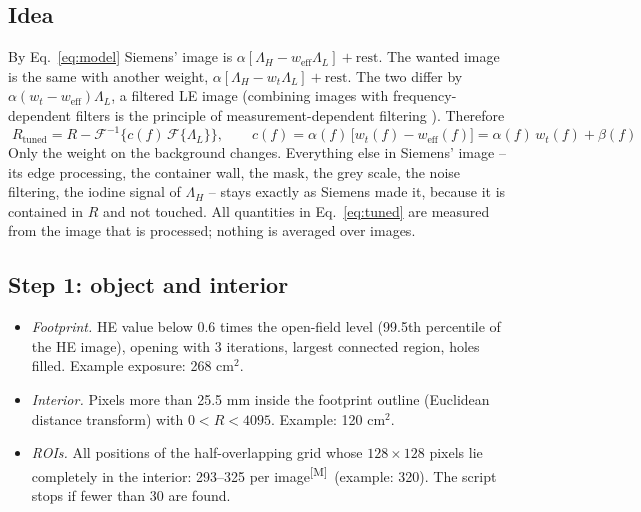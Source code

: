 \documentclass[11pt,a4paper]{article}
\newcommand{\LL}{\Lambda_L}
\newcommand{\LH}{\Lambda_H}
\newcommand{\weff}{w_\mathrm{eff}}
\newcommand{\wt}{w_t}
\newcommand{\M}{\textsuperscript{[M]}}
\begin{document}
\subsection{Idea}\label{sec:idea}
By Eq.~\eqref{eq:model} Siemens' image is $\alpha[\LH-\weff\LL]+\text{rest}$. The wanted image is the same with
another weight, $\alpha[\LH-\wt\LL]+\text{rest}$. The two differ by $\alpha(\wt-\weff)\LL$, a filtered LE image
(combining images with frequency-dependent filters is the principle of measurement-dependent filtering
\cite{macovski1983,cao1988}).
Therefore
\begin{equation}
\boxed{\;R_\mathrm{tuned} = R - \mathcal F^{-1}\!\Big\{c(f)\,\mathcal F\{\LL\}\Big\},\qquad
c(f)=\alpha(f)\,\big[\wt(f)-\weff(f)\big]=\alpha(f)\,\wt(f)+\beta(f)\;}
\label{eq:tuned}
\end{equation}
Only the weight on the background changes. Everything else in Siemens' image -- its edge processing, the container
wall, the mask, the grey scale, the noise filtering, the iodine signal of $\LH$ -- stays exactly as Siemens made
it, because it is contained in $R$ and not touched. All quantities in Eq.~\eqref{eq:tuned} are measured from the
image that is processed; nothing is averaged over images.

\subsection{Step 1: object and interior}\label{sec:step1}
\begin{itemize}
\item \emph{Footprint.} HE value below 0.6 times the open-field level (99.5th percentile of the HE image), opening
with 3 iterations, largest connected region, holes filled. Example exposure: 268 cm$^2$.
\item \emph{Interior.} Pixels more than 25.5 mm inside the footprint outline (Euclidean distance transform) with
$0<R<4095$. Example: 120 cm$^2$.
\item \emph{ROIs.} All positions of the half-overlapping grid whose $128\times128$ pixels lie completely in the
interior: 293--325 per image\M\ (example: 320). The script stops if fewer than 30 are found.
\end{itemize}
\end{document}
